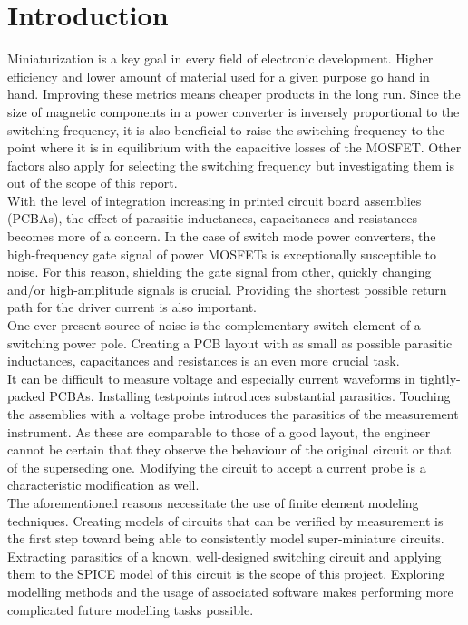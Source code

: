 \section{Introduction}
\label{sec:introduction}

Miniaturization is a key goal in every field of electronic development. Higher efficiency and lower amount of material used for a given purpose go hand in hand. Improving these metrics means cheaper products in the long run. Since the size of magnetic components in a power converter is inversely proportional to the switching frequency, it is also beneficial to raise the switching frequency to the point where it is in equilibrium with the capacitive losses of the MOSFET. Other factors also apply for selecting the switching frequency but investigating them is out of the scope of this report. \\

With the level of integration increasing in printed circuit board assemblies (PCBAs), the effect of parasitic inductances, capacitances and resistances becomes more of a concern. In the case of switch mode power converters, the high-frequency gate signal of power MOSFETs is exceptionally susceptible to noise. For this reason, shielding the gate signal from other, quickly changing and/or high-amplitude signals is crucial. Providing the shortest possible return path for the driver current is also important. \\

One ever-present source of noise is the complementary switch element of a switching power pole. Creating a PCB layout with as small as possible parasitic inductances, capacitances and resistances is an even more crucial task. \\

It can be difficult to measure voltage and especially current waveforms in tightly-packed PCBAs. Installing testpoints introduces substantial parasitics. Touching the assemblies with a voltage probe introduces the parasitics of the measurement instrument. As these are comparable to those of a good layout, the engineer cannot be certain that they observe the behaviour of the original circuit or that of the superseding one. Modifying the circuit to accept a current probe is a characteristic modification as well. \\

The aforementioned reasons necessitate the use of finite element modeling techniques. Creating models of circuits that can be verified by measurement is the first step toward being able to consistently model super-miniature circuits. Extracting parasitics of a known, well-designed switching circuit and applying them to the SPICE model of this circuit is the scope of this project. Exploring modelling methods and the usage of associated software makes performing more complicated future modelling tasks possible. \\